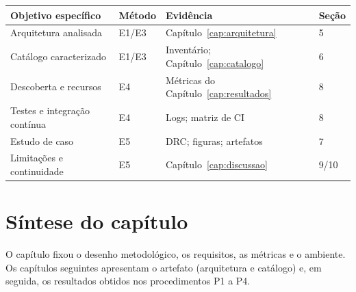 \begin{quadro}[htbp]
\centering
\small
\caption{Matriz de rastreabilidade objetivo--método--evidência.}
\label{qua:rastreabilidade}
\begin{tabular}{@{}p{4.6cm}p{3.4cm}p{3.8cm}p{2.6cm}@{}}
\toprule
\textbf{Objetivo específico} & \textbf{Método} & \textbf{Evidência} & \textbf{Seção} \\
\midrule
Arquitetura analisada & E1/E3 & Capítulo~\ref{cap:arquitetura} & 5 \\
Catálogo caracterizado & E1/E3 & Inventário; Capítulo~\ref{cap:catalogo} & 6 \\
Descoberta e recursos & E4 & Métricas do Capítulo~\ref{cap:resultados} & 8 \\
Testes e integração contínua & E4 & Logs; matriz de CI & 8 \\
Estudo de caso & E5 & DRC; figuras; artefatos & 7 \\
Limitações e continuidade & E5 & Capítulo~\ref{cap:discussao} & 9/10 \\
\bottomrule
\end{tabular}
\end{quadro}

\section{Síntese do capítulo}

O capítulo fixou o desenho metodológico, os requisitos, as métricas e o
ambiente. Os capítulos seguintes apresentam o artefato (arquitetura e
catálogo) e, em seguida, os resultados obtidos nos procedimentos P1 a P4.

